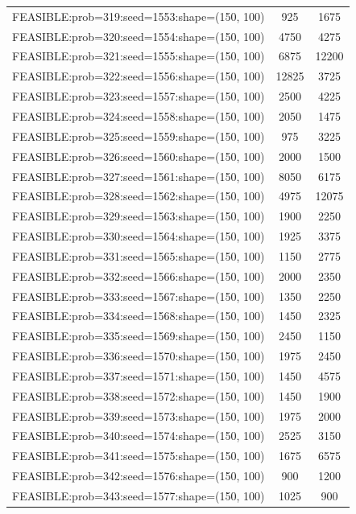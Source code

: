 \begin{longtable}{lcc}
FEASIBLE:prob=319:seed=1553:shape=(150, 100) &      925 &  1675 \\
FEASIBLE:prob=320:seed=1554:shape=(150, 100) &     4750 &  4275 \\
FEASIBLE:prob=321:seed=1555:shape=(150, 100) &     6875 & 12200 \\
FEASIBLE:prob=322:seed=1556:shape=(150, 100) &    12825 &  3725 \\
FEASIBLE:prob=323:seed=1557:shape=(150, 100) &     2500 &  4225 \\
FEASIBLE:prob=324:seed=1558:shape=(150, 100) &     2050 &  1475 \\
FEASIBLE:prob=325:seed=1559:shape=(150, 100) &      975 &  3225 \\
FEASIBLE:prob=326:seed=1560:shape=(150, 100) &     2000 &  1500 \\
FEASIBLE:prob=327:seed=1561:shape=(150, 100) &     8050 &  6175 \\
FEASIBLE:prob=328:seed=1562:shape=(150, 100) &     4975 & 12075 \\
FEASIBLE:prob=329:seed=1563:shape=(150, 100) &     1900 &  2250 \\
FEASIBLE:prob=330:seed=1564:shape=(150, 100) &     1925 &  3375 \\
FEASIBLE:prob=331:seed=1565:shape=(150, 100) &     1150 &  2775 \\
FEASIBLE:prob=332:seed=1566:shape=(150, 100) &     2000 &  2350 \\
FEASIBLE:prob=333:seed=1567:shape=(150, 100) &     1350 &  2250 \\
FEASIBLE:prob=334:seed=1568:shape=(150, 100) &     1450 &  2325 \\
FEASIBLE:prob=335:seed=1569:shape=(150, 100) &     2450 &  1150 \\
FEASIBLE:prob=336:seed=1570:shape=(150, 100) &     1975 &  2450 \\
FEASIBLE:prob=337:seed=1571:shape=(150, 100) &     1450 &  4575 \\
FEASIBLE:prob=338:seed=1572:shape=(150, 100) &     1450 &  1900 \\
FEASIBLE:prob=339:seed=1573:shape=(150, 100) &     1975 &  2000 \\
FEASIBLE:prob=340:seed=1574:shape=(150, 100) &     2525 &  3150 \\
FEASIBLE:prob=341:seed=1575:shape=(150, 100) &     1675 &  6575 \\
FEASIBLE:prob=342:seed=1576:shape=(150, 100) &      900 &  1200 \\
FEASIBLE:prob=343:seed=1577:shape=(150, 100) &     1025 &   900 \\

\end{longtable}
